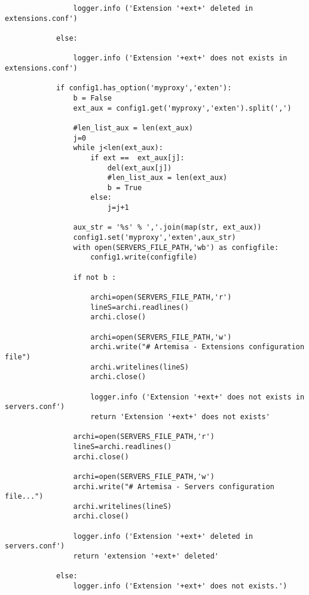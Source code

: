 \documentclass[a4paper,12pt]{report}
\newenvironment{myscriptlisting}
{\begin{list}{}{\setlength{\leftmargin}{1em}}\item\scriptsize\bfseries}
{\end{list}}
\begin{document}
{\begin{myscriptlisting}
\begin{verbatim}
                logger.info ('Extension '+ext+' deleted in extensions.conf')
                
            else:
                
                logger.info ('Extension '+ext+' does not exists in
extensions.conf')
        
            if config1.has_option('myproxy','exten'):
                b = False
                ext_aux = config1.get('myproxy','exten').split(',')
                
                #len_list_aux = len(ext_aux)
                j=0
                while j<len(ext_aux):
                    if ext ==  ext_aux[j]:
                        del(ext_aux[j])
                        #len_list_aux = len(ext_aux)
                        b = True
                    else:
                        j=j+1      
                
                aux_str = '%s' % ','.join(map(str, ext_aux))
                config1.set('myproxy','exten',aux_str)
                with open(SERVERS_FILE_PATH,'wb') as configfile:
                    config1.write(configfile)    
                   
                if not b :
                    
                    archi=open(SERVERS_FILE_PATH,'r')
                    lineS=archi.readlines()
                    archi.close()

                    archi=open(SERVERS_FILE_PATH,'w')                
                    archi.write("# Artemisa - Extensions configuration
file")
                    archi.writelines(lineS)
                    archi.close()
                    
                    logger.info ('Extension '+ext+' does not exists in
servers.conf')
                    return 'Extension '+ext+' does not exists'
                
                archi=open(SERVERS_FILE_PATH,'r')
                lineS=archi.readlines()
                archi.close()

                archi=open(SERVERS_FILE_PATH,'w')                
                archi.write("# Artemisa - Servers configuration file...")
                archi.writelines(lineS)
                archi.close()
                
                logger.info ('Extension '+ext+' deleted in servers.conf')
                return 'extension '+ext+' deleted' 
                    
            else:
                logger.info ('Extension '+ext+' does not exists.')
            

\end{verbatim}
\end{myscriptlisting}}
\end{document}
